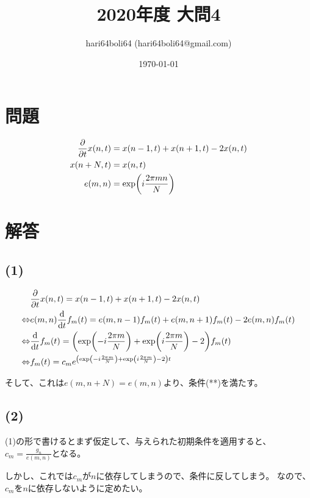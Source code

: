 \documentclass[a4paper, 10pt, dvipdfmx]{jlreq}
\begin{document}
\title{2020年度 大問4}
\author{hari64boli64 (hari64boli64@gmail.com)}
\date{\today}
\maketitle

\section{問題}

\begin{align*}
  \pdv{t}x(n,t) & =x(n-1,t)+x(n+1,t)-2x(n,t) \\
  x(n+N,t)      & =x(n,t)                    \\
  e(m,n)        & =\exp(i\frac{2\pi mn}{N})
\end{align*}

\section{解答}

\subsection*{(1)}

\begin{align*}
                  & \pdv{t}x(n,t)=x(n-1,t)+x(n+1,t)-2x(n,t)                                     \\
  \Leftrightarrow & e(m,n)\dv{t}f_m(t)=e(m,n-1)f_m(t)+e(m,n+1)f_m(t)-2e(m,n)f_m(t)              \\
  \Leftrightarrow & \dv{t}f_m(t)=\qty(\exp(-i\frac{2\pi m}{N})+\exp(i\frac{2\pi m}{N})-2)f_m(t) \\
  \Leftrightarrow & f_m(t)=c_me^{\qty(\exp(-i\frac{2\pi m}{N})+\exp(i\frac{2\pi m}{N})-2)t}     \\
\end{align*}

そして、これは$e(m,n+N)=e(m,n)$より、条件(**)を満たす。

\subsection*{(2)}

(1)の形で書けるとまず仮定して、与えられた初期条件を適用すると、$c_m=\frac{g_n}{e(m,n)}$となる。

しかし、これでは$c_m$が$n$に依存してしまうので、条件に反してしまう。
なので、$c_m$を$n$に依存しないように定めたい。
\end{document}
